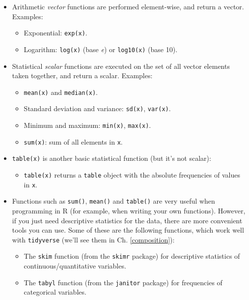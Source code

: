 \documentclass[
]{book}
\providecommand{\tightlist}{%
  \setlength{\itemsep}{0pt}\setlength{\parskip}{0pt}}
\begin{document}
\begin{itemize}
\tightlist
\item
  Arithmetic \emph{vector} functions are performed element-wise, and return a vector. Examples:

  \begin{itemize}
  \tightlist
  \item
    Exponential: \texttt{exp(x)}.
  \item
    Logarithm: \texttt{log(x)} (base \emph{e}) or \texttt{log10(x)} (base 10).
  \end{itemize}
\item
  Statistical \emph{scalar} functions are executed on the set of all vector elements taken together, and return a scalar. Examples:

  \begin{itemize}
  \tightlist
  \item
    \texttt{mean(x)} and \texttt{median(x)}.
  \item
    Standard deviation and variance: \texttt{sd(x)}, \texttt{var(x)}.
  \item
    Minimum and maximum: \texttt{min(x)}, \texttt{max(x)}.
  \item
    \texttt{sum(x)}: sum of all elements in \texttt{x}.
  \end{itemize}
\item
  \texttt{table(x)} is another basic statistical function (but it's not scalar):

  \begin{itemize}
  \tightlist
  \item
    \texttt{table(x)} returns a \texttt{table} object with the absolute frequencies of values in \texttt{x}.
  \end{itemize}
\item
  Functions such as \texttt{sum()}, \texttt{mean()} and \texttt{table()} are very useful when programming in R (for example, when writing your own functions). However, if you just need descriptive statistics for the data, there are more convenient tools you can use. Some of these are the following functions, which work well with \texttt{tidyverse} (we'll see them in Ch. \ref{composition}):

  \begin{itemize}
  \tightlist
  \item
    The \texttt{skim} function (from the \texttt{skimr} package) for descriptive statistics of continuous/quantitative variables.
  \item
    The \texttt{tabyl} function (from the \texttt{janitor} package) for frequencies of categorical variables.
  \end{itemize}
\end{itemize}
\end{document}

